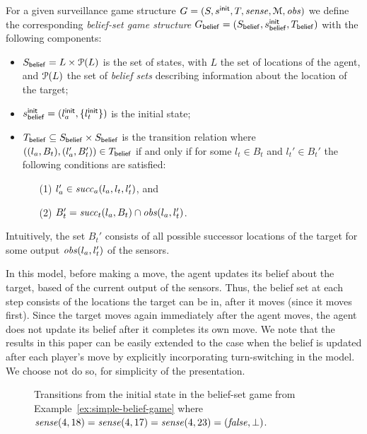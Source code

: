 For a given surveillance game structure $G  = (S,s^{\mathsf{init}},T,\mathit{sense},\mathcal M, \mathit{obs})$ we define the corresponding \emph{belief-set game structure} $G_{\mathsf{belief}}  = (S_{\mathsf{belief}},s^{\mathsf{init}}_{\mathsf{belief}},T_{\mathsf{belief}})$ with the following components:
\begin{itemize}
\item $S_{\mathsf{belief}} = L \times \mathcal{P}(L)$ is the set of states, with $L$ the set of locations of the agent, and $\mathcal{P}(L)$ the set of \emph{belief sets} describing information about the location of the target;
\item $s^{\mathsf{init}}_{\mathsf{belief}} = (l_a^{\mathsf{init}},\{l_t^{\mathsf{init}}\})$ is the initial state;
\item $T_{\mathsf{belief}} \subseteq S_{\mathsf{belief}} \times S_{\mathsf{belief}}$ is the transition relation where $((l_a, B_t),(l_a', B_t')) \in T_{\mathsf{belief}}$ if and only if for some $l_t \in B_t$ and $l_t' \in B_t'$ the following conditions are satisfied:
\begin{itemize}
    \item[(1)] $l_a' \in  \mathit{succ}_a(l_a,l_t,l_t')$, and
    \item[(2)] $B_t' = \mathit{succ}_t(l_a,B_t) \cap \mathit{obs}(l_a,l_t')$.
\end{itemize}

\end{itemize}
Intuitively, the set $B_t'$ consists of all possible successor locations of the target for some output $\mathit{obs}(l_a,l_t')$ of the sensors.  

\bigskip
{} In this model, before making a move, the agent updates its belief about the target, based of the current output of the sensors. Thus, the belief set at each step consists of the locations the target can be in, after it moves (since it moves first). Since the target moves again immediately after the agent moves, the agent does not update its belief after it completes its own move. We note that the results in this paper can be easily extended to the case when the belief is updated after each player's move by explicitly incorporating turn-switching in the model. We choose not do so, for simplicity of the presentation.

\begin{figure}

\caption{Transitions from the initial state in the belief-set game from Example~\ref{ex:simple-belief-game} where $\mathit{sense}(4,18)=\mathit{sense}(4,17) = \mathit{sense}(4,23) = (\mathit{false},\bot)$.}
\label{fig:simple-belief-game}

\end{figure}

